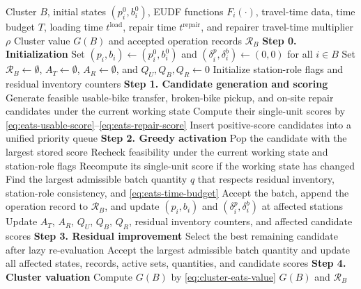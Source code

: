 \begin{breakablealgorithm}
\caption{EATS evaluation of a cluster}
\label{alg:eats}
\begin{algorithmic}[1]
\Require Cluster $B$, initial states $(p_i^0,b_i^0)$, EUDF functions $F_i(\cdot)$,
travel-time data, time budget $T$, loading time $t^{\mathrm{load}}$, repair time
$t^{\mathrm{repair}}$, and repairer travel-time multiplier $\rho$
\Ensure Cluster value $G(B)$ and accepted operation records $\mathcal R_B$
\Statex \textbf{Step 0. Initialization}
\State Set $(p_i,b_i)\gets(p_i^0,b_i^0)$ and $(\delta_i^p,\delta_i^b)\gets(0,0)$
for all $i\in B$
\State Set $\mathcal R_B\gets\emptyset$, $A_T\gets\emptyset$, $A_R\gets\emptyset$,
and $Q_U,Q_B,Q_R\gets0$
\State Initialize station-role flags and residual inventory counters
\Statex \textbf{Step 1. Candidate generation and scoring}
\State Generate feasible usable-bike transfer, broken-bike pickup, and on-site
repair candidates under the current working state
\State Compute their single-unit scores by
\eqref{eq:eats-usable-score}--\eqref{eq:eats-repair-score}
\State Insert positive-score candidates into a unified priority queue
\Statex \textbf{Step 2. Greedy activation}
    \State Pop the candidate with the largest stored score
    \State Recheck feasibility under the current working state and station-role flags
    \State Recompute its single-unit score if the working state has changed
        \State Find the largest admissible batch quantity $q$ that respects residual
        inventory, station-role consistency, and \eqref{eq:eats-time-budget}
            \State Accept the batch, append the operation record to $\mathcal R_B$,
            and update $(p_i,b_i)$ and $(\delta_i^p,\delta_i^b)$ at affected stations
            \State Update $A_T$, $A_R$, $Q_U$, $Q_B$, $Q_R$, residual inventory
            counters, and affected candidate scores
        \EndIf
    \EndIf
\EndWhile
\Statex \textbf{Step 3. Residual improvement}
    \State Select the best remaining candidate after lazy re-evaluation
    \State Accept the largest admissible batch quantity and update all affected states,
    records, active sets, quantities, and candidate scores
\EndWhile
\Statex \textbf{Step 4. Cluster valuation}
\State Compute $G(B)$ by \eqref{eq:cluster-eats-value}
\State \Return $G(B)$ and $\mathcal R_B$
\end{algorithmic}
\end{breakablealgorithm}

